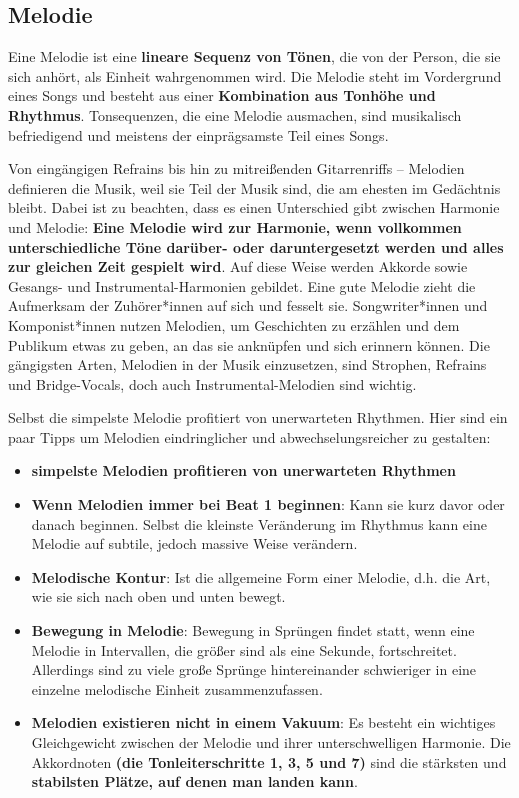 \subsection{Melodie}
Eine Melodie ist eine \textbf{lineare Sequenz von Tönen}, die von der Person, 
die sie sich anhört, als Einheit wahrgenommen wird. Die Melodie steht im Vordergrund 
eines Songs und besteht aus einer \textbf{Kombination aus Tonhöhe und Rhythmus}. Tonsequenzen, 
die eine Melodie ausmachen, sind musikalisch befriedigend und meistens der einprägsamste 
Teil eines Songs.

Von eingängigen Refrains bis hin zu mitreißenden Gitarrenriffs – Melodien definieren die Musik, 
weil sie Teil der Musik sind, die am ehesten im Gedächtnis bleibt. Dabei ist zu beachten, dass 
es einen Unterschied gibt zwischen Harmonie 
und Melodie: \textbf{Eine Melodie wird zur Harmonie, wenn vollkommen unterschiedliche Töne darüber- oder 
daruntergesetzt werden und alles zur gleichen Zeit gespielt wird}. Auf diese Weise werden Akkorde 
sowie Gesangs- und Instrumental-Harmonien gebildet. Eine gute Melodie zieht die Aufmerksam der 
Zuhörer*innen auf sich und fesselt sie. Songwriter*innen und Komponist*innen nutzen Melodien, 
um Geschichten zu erzählen und dem Publikum etwas zu geben, an das sie anknüpfen und sich erinnern 
können. Die gängigsten Arten, Melodien in der Musik einzusetzen, sind Strophen, Refrains und Bridge-Vocals, 
doch auch Instrumental-Melodien sind wichtig.

Selbst die simpelste Melodie profitiert von unerwarteten Rhythmen. Hier sind ein paar Tipps um Melodien 
eindringlicher und abwechselungsreicher zu gestalten:
\begin{itemize}
    \item \textbf{simpelste Melodien profitieren von unerwarteten Rhythmen}
    \item \textbf{Wenn Melodien immer bei Beat 1 beginnen}: Kann sie kurz davor oder danach beginnen. Selbst die 
    kleinste Veränderung im Rhythmus kann eine Melodie auf subtile, jedoch massive Weise verändern.
    \item \textbf{Melodische Kontur}: Ist die allgemeine Form einer Melodie, d.h. die Art, wie sie sich nach 
    oben und unten bewegt.
    \item \textbf{Bewegung in Melodie}: Bewegung in Sprüngen findet statt, wenn eine Melodie in Intervallen, die 
    größer sind als eine Sekunde, fortschreitet. Allerdings sind zu viele große Sprünge hintereinander schwieriger 
    in eine einzelne melodische Einheit zusammenzufassen.
    \item \textbf{Melodien existieren nicht in einem Vakuum}: Es besteht ein wichtiges Gleichgewicht zwischen der 
    Melodie und ihrer unterschwelligen Harmonie. Die Akkordnoten \textbf{(die Tonleiterschritte 1, 3, 5 und 7)} sind die 
    stärksten und \textbf{stabilsten Plätze, auf denen man landen kann}.
    
\end{itemize}



